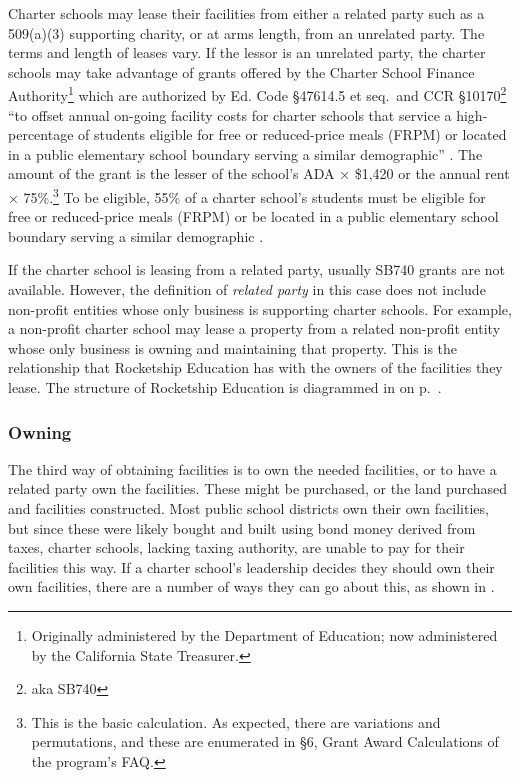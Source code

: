 Charter schools may lease their facilities from either a related party such as a 509(a)(3) supporting charity, or at arms length, from an unrelated party. The terms and length of leases vary. If the lessor is an unrelated party, the charter schools may take advantage of grants offered by the Charter School Finance Authority\footnote{Originally administered by the Department of Education; now administered by the California State Treasurer.} which are authorized by Ed. Code §47614.5 et seq. and CCR §10170\footnote{aka SB740} ``to offset annual on-going facility costs for charter schools that service a high-percentage of students eligible for free or reduced-price meals (FRPM) or located in a public elementary school boundary serving a similar demographic'' \parencite{CATreasurer2023}. The amount of the grant is the lesser of the school's ADA × \$1,420 or the annual rent × 75\%.\footnote{This is the basic calculation. As expected, there are variations and permutations, and these are enumerated in §6, Grant Award Calculations of the program's FAQ\@.} To be eligible, 55\% of a charter school's students must be eligible for free or reduced-price meals (FRPM) or be located in a public elementary school boundary serving a similar demographic \parencite[§1]{CATreasurer2023}.

If the charter school is leasing from a related party, usually SB740 grants are not available. However, the definition of \emph{related party} in this case does not include non-profit entities whose only business is supporting charter schools. For example, a non-profit charter school may lease a property from a related non-profit entity whose only business is owning and maintaining that property. This is the relationship that Rocketship Education has with the owners of the facilities they lease. The structure of Rocketship Education is diagrammed in  on p.~\pageref{fig:corporate-structure}.

\subsubsection{Owning}\label{sec:owning}\indent%

The third way of obtaining facilities is to own the needed facilities, or to have a related party own the facilities. These might be purchased, or the land purchased and facilities constructed. Most public school districts own their own facilities, but since these were likely bought and built using bond money derived from taxes, charter schools, lacking taxing authority, are unable to pay for their facilities this way.
If a charter school's leadership decides they should own their own facilities, there are a number of ways they can go about this, as shown in .

